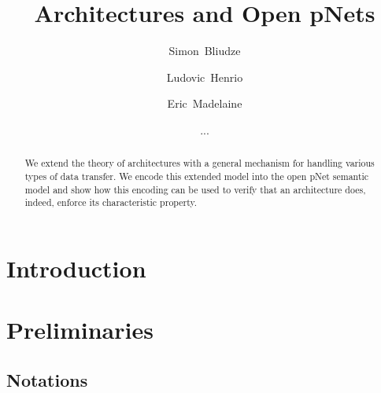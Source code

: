 \documentclass{llncs}
\begin{document}
\graphicspath{{figures/}}

\title{Architectures and Open pNets}

\author{%
Simon~Bliudze
\and
Ludovic~Henrio
\and
Eric~Madelaine
\and
...
}



\maketitle

\begin{abstract}
  We extend the theory of architectures with a general
  mechanism for handling various types of data transfer.  We
  encode this extended model into the open pNet semantic
  model and show how this encoding can be used to verify
  that an architecture does, indeed, enforce its
  characteristic property.

\keywords{}
\end{abstract}


\section{Introduction}
\label{secn:introduction}


\section{Preliminaries}
\label{secn:preliminaries}


\subsection{Notations}
\label{secn:notations}
\end{document}
